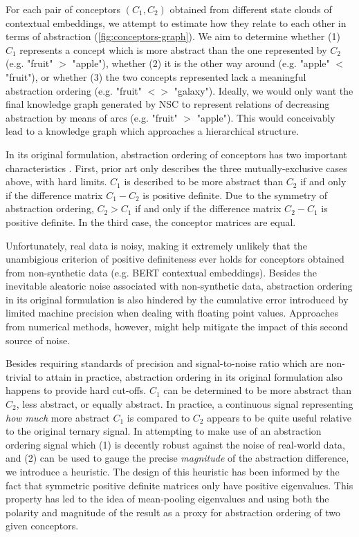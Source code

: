 For each pair of conceptors $(C_1, C_2)$ obtained from different state clouds of contextual embeddings, we attempt to estimate how they relate to each other in terms of abstraction (\ref{fig:conceptors-graph}). We aim to determine whether (1) $C_1$ represents a concept which is more abstract than the one represented by $C_2$ (e.g. "fruit" $>$ "apple"), whether (2) it is the other way around (e.g. "apple" $<$ "fruit"), or whether (3) the two concepts represented lack a meaningful abstraction ordering (e.g. "fruit" $<>$ "galaxy"). Ideally, we would only want the final knowledge graph generated by NSC to represent relations of decreasing abstraction by means of arcs (e.g. "fruit" $>$ "apple"). This would conceivably lead to a knowledge graph which approaches a hierarchical structure.

In its original formulation, abstraction ordering of conceptors has two important characteristics \citep{jaeger_controlling_2017}. First, prior art only describes the three mutually-exclusive cases above, with hard limits. $C_1$ is described to be more abstract than $C_2$ if and only if the difference matrix $C_1 - C_2$ is positive definite. Due to the symmetry of abstraction ordering, $C_2 > C_1$ if and only if the difference matrix $C_2 - C_1$ is positive definite. In the third case, the conceptor matrices are equal.

Unfortunately, real data is noisy, making it extremely unlikely that the unambigious criterion of positive definiteness ever holds for conceptors obtained from non-synthetic data (e.g. BERT contextual embeddings). Besides the inevitable aleatoric noise associated with non-synthetic data, abstraction ordering in its original formulation is also hindered by the cumulative error introduced by limited machine precision when dealing with floating point values. Approaches from numerical methods, however, might help mitigate the impact of this second source of noise.

Besides requiring standards of precision and signal-to-noise ratio which are non-trivial to attain in practice, abstraction ordering in its original formulation also happens to provide hard cut-offs. $C_1$ can be determined to be more abstract than $C_2$, less abstract, or equally abstract. In practice, a continuous signal representing \textit{how much} more abstract $C_1$ is compared to $C_2$ appears to be quite useful relative to the original ternary signal. In attempting to make use of an abstraction ordering signal which (1) is decently robust against the noise of real-world data, and (2) can be used to gauge the precise \textit{magnitude} of the abstraction difference, we introduce a heuristic. The design of this heuristic has been informed by the fact that symmetric positive definite matrices only have positive eigenvalues. This property has led to the idea of mean-pooling eigenvalues and using both the polarity and magnitude of the result as a proxy for abstraction ordering of two given conceptors.

